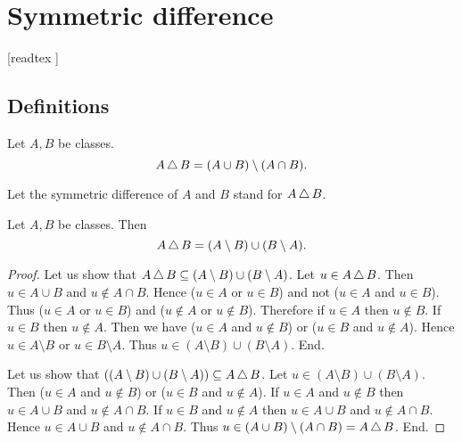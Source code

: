 \documentclass[../set-theory.tex]{subfiles}
\begin{document}
  \chapter{Symmetric difference}\label{symmetric-difference}


  \begin{forthel}

    [readtex ]

  \end{forthel}


  \section{Definitions}

  \begin{forthel}
    \begin{definition}
      Let $A, B$ be classes.
      \[ A \mathop{\triangle} B = (A \cup B) \setminus (A \cap B). \]
    \end{definition}

    Let the symmetric difference of $A$ and $B$ stand for $A \mathop{\triangle} B$.
  \end{forthel}

  \begin{forthel}
    \begin{proposition}
      Let $A, B$ be classes.
      Then \[ A \mathop{\triangle} B = (A \setminus B) \cup (B \setminus A). \]
    \end{proposition}
    \begin{proof}
      Let us show that $A \mathop{\triangle} B \subseteq (A \setminus B) \cup (B \setminus A)$.
        Let $u \in A \mathop{\triangle} B$.
        Then $u \in A \cup B$ and $u \notin A \cap B$.
        Hence ($u \in A$ or $u \in B$) and not ($u \in A$ and $u \in B$).
        Thus ($u \in A$ or $u \in B$) and ($u \notin A$ or $u \notin B$).
        Therefore if $u \in A$ then $u \notin B$.
        If $u \in B$ then $u \notin A$.
        Then we have ($u \in A$ and $u \notin B$) or ($u \in B$ and $u \notin A$).
        Hence $u \in A \setminus B$ or $u \in B \setminus A$.
        Thus $u \in (A \setminus B) \cup (B \setminus A)$.
      End.

      Let us show that $((A \setminus B) \cup (B \setminus A)) \subseteq A \mathop{\triangle} B$. %
        Let $u \in (A \setminus B) \cup (B \setminus A)$.
        Then ($u \in A$ and $u \notin B$) or ($u \in B$ and $u \notin A$).
        If $u \in A$ and $u \notin B$ then $u \in A \cup B$ and $u \notin A \cap B$.
        If $u \in B$ and $u \notin A$ then $u \in A \cup B$ and $u \notin A \cap B$.
        Hence $u \in A \cup B$ and $u \notin A \cap B$.
        Thus $u \in (A \cup B) \setminus (A \cap B) = A \mathop{\triangle} B$.
      End.
    \end{proof}
  \end{forthel}
\end{document}
